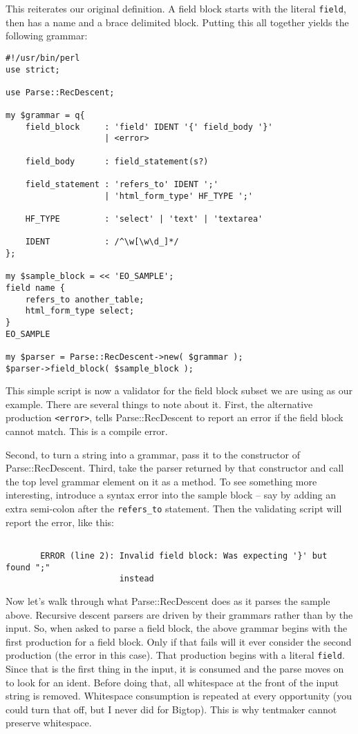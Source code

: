 This reiterates our original definition.  A field block starts with the
literal \verb+field+, then has a name and a brace delimited block.
Putting this all together yields the following grammar:

\begin{verbatim}
#!/usr/bin/perl
use strict;

use Parse::RecDescent;

my $grammar = q{
    field_block     : 'field' IDENT '{' field_body '}'
                    | <error>

    field_body      : field_statement(s?)

    field_statement : 'refers_to' IDENT ';'
                    | 'html_form_type' HF_TYPE ';'

    HF_TYPE         : 'select' | 'text' | 'textarea'

    IDENT           : /^\w[\w\d_]*/
};

my $sample_block = << 'EO_SAMPLE';
field name {
    refers_to another_table;
    html_form_type select;
}
EO_SAMPLE

my $parser = Parse::RecDescent->new( $grammar );
$parser->field_block( $sample_block );
\end{verbatim}

This simple script is now a validator for the field block subset we
are using as our example.  There are several things to note about it.
First, the alternative production \verb+<error>+, tells Parse::RecDescent
to report an error if the field block cannot match.  This is a compile
error.

Second, to turn a string into a grammar, pass it to the constructor of
Parse::RecDescent.  Third, take the parser returned by that constructor
and call the top level grammar element on it as a method.  To see
something more interesting, introduce a syntax error into the sample
block -- say by adding an extra semi-colon after the \verb+refers_to+
statement.  Then the validating script will report the error, like this:

\begin{verbatim}

       ERROR (line 2): Invalid field block: Was expecting '}' but found ";"
                       instead
\end{verbatim}

Now let's walk through what Parse::RecDescent does as it parses the
sample above.  Recursive descent parsers are driven by their grammars
rather than by the input.  So, when asked to parse a field block, the
above grammar begins with the first production for a field block.  Only
if that fails will it ever consider the second production (the error
in this case).  That production begins with a literal \verb+field+.
Since that is the first thing in the input, it is consumed and the parse
moves on to look for an ident.  Before doing that, all whitespace at the
front of the input string is removed.  Whitespace consumption is repeated
at every opportunity (you could turn that off, but I never did for Bigtop).
This is why tentmaker cannot preserve whitespace.

